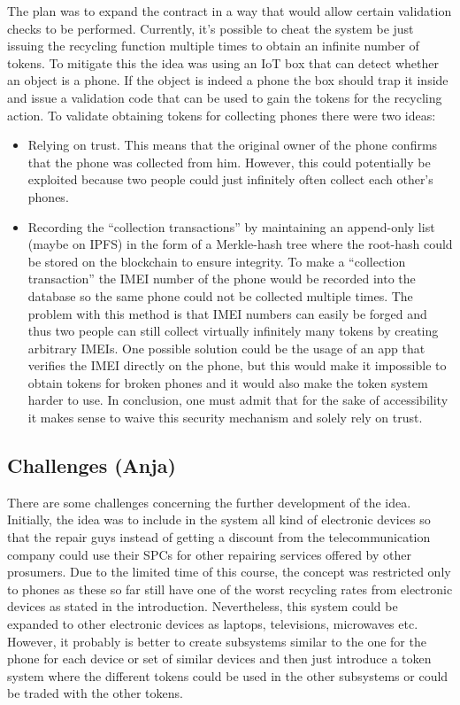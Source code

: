 \documentclass[11pt]{scrartcl}
\begin{document}
The plan was to expand the contract in a way that would allow certain validation checks to be performed. Currently, it's possible to cheat the system be just issuing the recycling function multiple times to obtain an infinite number of tokens. To mitigate this the idea was using an IoT box that can detect whether an object is a phone. If the object is indeed a phone the box should trap it inside and issue a validation code that can be used to gain the tokens for the recycling action.  To validate obtaining tokens for collecting phones there were two ideas:

\begin{itemize}
    \item Relying on trust. This means that the original owner of the phone
        confirms that the phone was collected from him. However, this could
        potentially be exploited because two people could just infinitely often
        collect each other's phones.
    \item Recording the ``collection transactions'' by maintaining an append-only
        list (maybe on IPFS) in the form of a Merkle-hash tree where the
        root-hash could be stored on the blockchain to ensure integrity. To
        make a ``collection transaction'' the IMEI number of the phone would be
        recorded into the database so the same phone could not be collected
        multiple times.  The problem with this method is that IMEI numbers can
        easily be forged and thus two people can still collect virtually
        infinitely many tokens by creating arbitrary IMEIs. One possible
        solution could be the usage of an app that verifies the IMEI directly
        on the phone, but this would make it impossible to obtain tokens for
        broken phones and it would also make the token system harder to use.
        In conclusion, one must admit that for the sake of accessibility it
        makes sense to waive this security mechanism and solely rely on trust.
\end{itemize}


\subsection{Challenges (Anja)}
There are some challenges concerning the further development of the idea. Initially, the idea was to include in the system all kind of electronic devices so that the repair guys instead of getting a discount from the telecommunication company could use their SPCs for other repairing services offered by other prosumers. Due to the limited time of this course, the concept was restricted only to phones as these so far still have one of the worst recycling rates from electronic devices as stated in the introduction. Nevertheless, this system could be expanded to other electronic devices as laptops, televisions, microwaves etc. However, it probably is better to create subsystems similar to the one for the phone for each device or set of similar devices and then just introduce a token system where the different tokens could be used in the other subsystems or could be traded with the other tokens.
\end{document}
